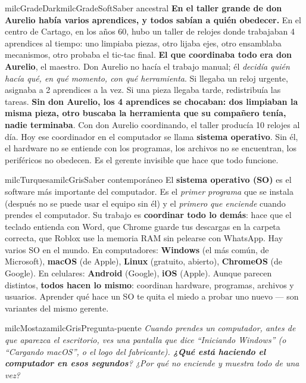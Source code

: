 \documentclass[11pt,letterpaper]{article}
\begin{document}
\begin{softbox}{milcGradeDark}{milcGradeSoft}{Saber ancestral}
\textbf{En el taller grande de don Aurelio había varios aprendices, y todos sabían a quién obedecer.} En el centro de Cartago, en los años 60, hubo un taller de relojes donde trabajaban 4 aprendices al tiempo: uno limpiaba piezas, otro lijaba ejes, otro ensamblaba mecanismos, otro probaba el tic-tac final. \textbf{El que coordinaba todo era don Aurelio}, el maestro. Don Aurelio no hacía el trabajo manual; él \emph{decidía quién hacía qué, en qué momento, con qué herramienta}. Si llegaba un reloj urgente, asignaba a 2 aprendices a la vez. Si una pieza llegaba tarde, redistribuía las tareas. \textbf{Sin don Aurelio, los 4 aprendices se chocaban: dos limpiaban la misma pieza, otro buscaba la herramienta que su compañero tenía, nadie terminaba}. Con don Aurelio coordinando, el taller producía 10 relojes al día. Hoy ese coordinador en el computador se llama \textbf{sistema operativo}. Sin él, el hardware no se entiende con los programas, los archivos no se encuentran, los periféricos no obedecen. Es el gerente invisible que hace que todo funcione.
\end{softbox}

\begin{softbox}{milcTurquesa}{milcGris}{Saber contemporáneo}
El \textbf{sistema operativo (SO)} es el software más importante del computador. Es el \emph{primer programa} que se instala (después no se puede usar el equipo sin él) y el \emph{primero que enciende} cuando prendes el computador. Su trabajo es \textbf{coordinar todo lo demás}: hace que el teclado entienda con Word, que Chrome guarde tus descargas en la carpeta correcta, que Roblox use la memoria RAM sin pelearse con WhatsApp. Hay varios SO en el mundo. En computadores: \textbf{Windows} (el más común, de Microsoft), \textbf{macOS} (de Apple), \textbf{Linux} (gratuito, abierto), \textbf{ChromeOS} (de Google). En celulares: \textbf{Android} (Google), \textbf{iOS} (Apple). Aunque parecen distintos, \textbf{todos hacen lo mismo}: coordinan hardware, programas, archivos y usuarios. Aprender qué hace un SO te quita el miedo a probar uno nuevo --- son variantes del mismo gerente.
\end{softbox}

\begin{softbox}{milcMostaza}{milcGris}{Pregunta-puente}
\textit{Cuando prendes un computador, antes de que aparezca el escritorio, ves una pantalla que dice \emph{``Iniciando Windows''} (o ``Cargando macOS'', o el logo del fabricante). \textbf{¿Qué está haciendo el computador en esos segundos}? ¿Por qué no enciende y muestra todo de una vez?}
\end{softbox}
\end{document}
